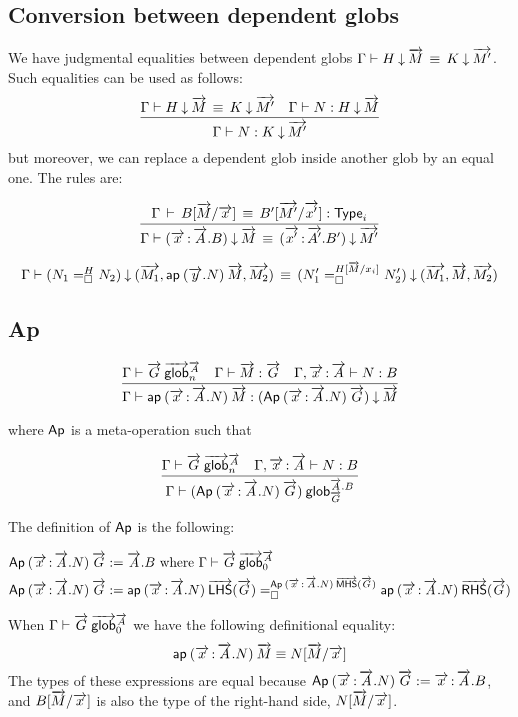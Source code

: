 \subsection{Conversion between dependent globs}

We have judgmental equalities between dependent globs
$\deqdepglob{\Gamma}H{\tel{M}}K{\tel{M'}}$. Such equalities can be used as
follows:
\[
\infer
  {\ofdepglob{\Gamma}{N}{K}{\tel{M'}}}
  {\deqdepglob{\Gamma}H{\tel{M}}K{\tel{M'}}
  &\ofdepglob{\Gamma}{N}{H}{\tel{M}}}
\]
but moreover, we can replace a dependent glob inside another glob by an equal
one. The rules are:

\[
\infer
  {\deqdepglob{\Gamma}{(\teltm xA.B)}{\tel{M}}
   {(\teltm{x'}{A'}.B')}{\tel{M'}}}
  {\deqtype{\Gamma}{B[\tel{M}/\tel{x}]}{B'[\tel{M'}/\tel{x'}]}}
\]

\[
\deqdepglob{\Gamma}
  {(\dhomj{H}{N_1}{N_2}{\blank})}
  {(\tel{M_1},\ap{(\tel y.N)}{\tel M},\tel{M_2})}
  {(\dhomj{H[\tel M/x_i]}{N_1'}{N_2'}{\blank})}
  {(\tel{M_1},\tel M,\tel{M_2})}
\]



\subsection{Ap}

\[\infer{\ofdepglob{\Gamma}{\ap{(\teltm xA.N)}{\tel M}}
  {(\Ap{(\teltm xA.N)}{\tel G})}{\tel M}}
{\wfglob{\Gamma}{\tel G}{\tel A}n
  & \ofglob{\Gamma}{\tel M}{\tel G}
  & \ofglob{\Gamma,\teltm xA}{N}{B}}\]

where $\dsd{Ap}$ is a meta-operation such that

\[\infer{\wfdepglob{\Gamma}{(\Ap{(\teltm xA.N)}{\tel G})}
  {\tel A.B}{\tel G}}
{\wfglob{\Gamma}{\tel G}{\tel A}n
  & \ofglob{\Gamma,\teltm xA}{N}{B}}\]

The definition of $\dsd{Ap}$ is the following:

\[\begin{aligned}
\Ap{(\teltm xA.N)}{\tel G} & := \tel A.B
\text{ where $\wfglob{\Gamma}{\tel G}{\tel A}0$} \\
\Ap{(\teltm xA.N)}{\tel G} & := 
  \dhomj
    {\Ap{(\teltm xA.N)}{\mhs{\tel G}}}
    {\ap{(\teltm xA.N)}{\lhs{\tel G}}}
    {\ap{(\teltm xA.N)}{\rhs{\tel G}}}{\blank}
\end{aligned}\]

When $\wfglob{\Gamma}{\tel G}{\tel A}0$ we have the following definitional
equality:
\[ \ap{(\teltm xA.N)}{\tel M} \equiv N[\tel M/\tel x] \]
The types of these expressions are equal because
$\Ap{(\teltm xA.N)}{\tel G} := \teltm xA.B$,
and $B[\tel M/\tel x]$ is also the type of the right-hand side, $N[\tel M/\tel
x]$.

